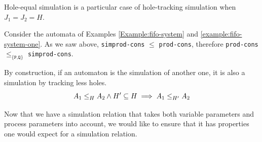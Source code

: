 \documentclass[runningheads]{llncs}
\newcommand{\xrightarrowdbl}[2][]{%
  \xrightarrow[#1]{#2}\mathrel{\mkern-14mu}\rightarrow
}
\begin{document}

\begin{property}\label{lem-sim-sim}
Hole-equal simulation is a particular case of hole-tracking simulation when  $J_1=J_2=H$.
\end{property}
\begin{example} Consider the automata of Examples \ref{Example:fifo-system} and \ref{example:fifo-system-one}. As we saw above, \texttt{simprod-cons} $\leq$ \texttt{prod-cons}, therefore \texttt{prod-cons} $\leq_{\{\texttt{P,Q}\}}$ \texttt{simprod-cons}.
\end{example}



%
%

\begin{property} By construction, if an automaton is the simulation of another one, it is also a simulation by tracking less holes.
\[\wrel{A_1}{A_2}{H} \land H'\subseteq H \implies \wrel{A_1}{A_2}{H'}\]
\end{property}

Now that we have a simulation relation that takes both variable parameters and process parameters into account, we would like to ensure that it has  properties one would expect for a simulation relation.
\end{document}
